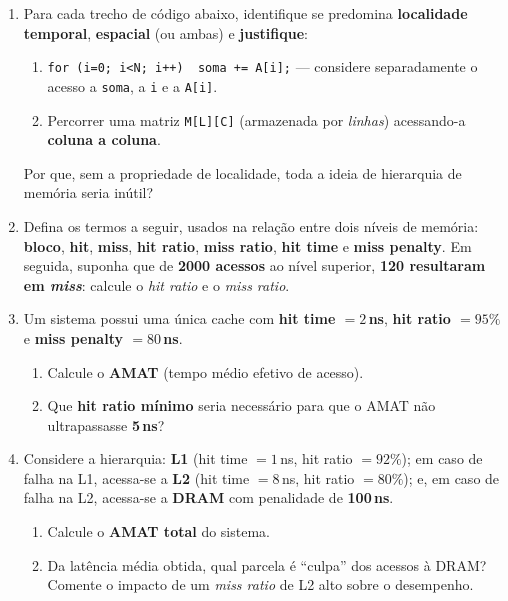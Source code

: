\documentclass[10pt, a4paper]{article}
\begin{document}
\begin{enumerate}
\item Para cada trecho de c\'{o}digo abaixo, identifique se predomina \textbf{localidade temporal}, \textbf{espacial} (ou ambas) e \textbf{justifique}:
\begin{enumerate}
  \item \texttt{for (i=0; i<N; i++)\ \ soma += A[i];} \quad --- considere separadamente o acesso a \texttt{soma}, a \texttt{i} e a \texttt{A[i]}.
  \item Percorrer uma matriz \texttt{M[L][C]} (armazenada por \emph{linhas}) acessando-a \textbf{coluna a coluna}.
\end{enumerate}
Por que, sem a propriedade de localidade, toda a ideia de hierarquia de mem\'{o}ria seria in\'{u}til?

\item Defina os termos a seguir, usados na rela\c{c}\~{a}o entre dois n\'{i}veis de mem\'{o}ria: \textbf{bloco}, \textbf{hit}, \textbf{miss}, \textbf{hit ratio}, \textbf{miss ratio}, \textbf{hit time} e \textbf{miss penalty}. Em seguida, suponha que de \textbf{2000 acessos} ao n\'{i}vel superior, \textbf{120 resultaram em \emph{miss}}: calcule o \emph{hit ratio} e o \emph{miss ratio}.

\item Um sistema possui uma \'{u}nica cache com \textbf{hit time $=2$\,ns}, \textbf{hit ratio $=95\%$} e \textbf{miss penalty $=80$\,ns}.
\begin{enumerate}
  \item Calcule o \textbf{AMAT} (tempo m\'{e}dio efetivo de acesso).
  \item Que \textbf{hit ratio m\'{i}nimo} seria necess\'{a}rio para que o AMAT n\~{a}o ultrapassasse \textbf{5\,ns}?
\end{enumerate}

\item Considere a hierarquia: \textbf{L1} (hit time $=1$\,ns, hit ratio $=92\%$); em caso de falha na L1, acessa-se a \textbf{L2} (hit time $=8$\,ns, hit ratio $=80\%$); e, em caso de falha na L2, acessa-se a \textbf{DRAM} com penalidade de \textbf{100\,ns}.
\begin{enumerate}
  \item Calcule o \textbf{AMAT total} do sistema.
  \item Da lat\^{e}ncia m\'{e}dia obtida, qual parcela \'{e} ``culpa'' dos acessos \`{a} DRAM? Comente o impacto de um \emph{miss ratio} de L2 alto sobre o desempenho.
\end{enumerate}


\end{enumerate}
\end{document}
